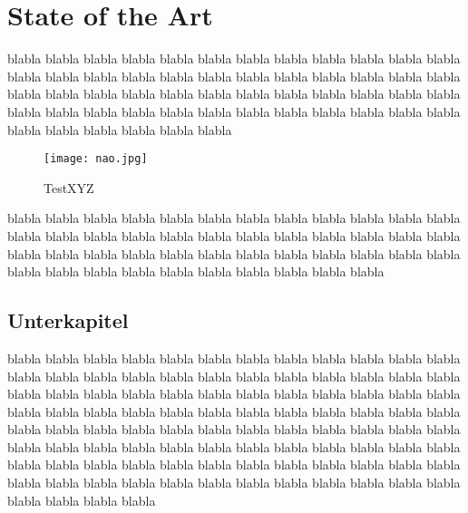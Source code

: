 \documentclass[12pt,a4paper,DIV13,pdftex,BCOR10mm,fleqn,liststotoc,bibtotoc,cleardoubleempty]{scrbook}
\begin{document}
\chapter{State of the Art}
blabla blabla blabla blabla blabla blabla blabla blabla blabla blabla blabla blabla blabla blabla blabla blabla blabla blabla blabla blabla blabla blabla blabla blabla blabla blabla blabla blabla blabla blabla blabla blabla blabla blabla blabla blabla blabla blabla blabla blabla blabla blabla blabla blabla blabla blabla blabla blabla blabla blabla blabla blabla blabla blabla
\begin{figure}[htb]
\centering
\texttt{[image: nao.jpg]} %
\caption{TestXYZ}
\label{TestXYZ}
\end{figure}
blabla blabla blabla blabla blabla blabla blabla blabla blabla blabla blabla blabla blabla blabla blabla blabla blabla blabla blabla blabla blabla blabla blabla blabla blabla blabla blabla blabla blabla blabla blabla blabla blabla blabla blabla blabla blabla blabla blabla blabla blabla blabla blabla blabla blabla blabla
\section{Unterkapitel}
blabla blabla blabla blabla blabla blabla blabla blabla blabla blabla blabla blabla blabla blabla blabla blabla blabla blabla blabla blabla blabla blabla blabla blabla blabla blabla blabla blabla blabla blabla blabla blabla blabla blabla blabla blabla blabla blabla blabla blabla blabla blabla blabla blabla blabla blabla blabla blabla blabla blabla blabla blabla blabla blabla
blabla blabla blabla blabla blabla blabla blabla blabla blabla blabla blabla blabla blabla blabla blabla blabla blabla blabla blabla blabla blabla blabla blabla blabla blabla blabla blabla blabla blabla blabla blabla blabla blabla blabla blabla blabla blabla blabla blabla blabla blabla blabla blabla blabla blabla blabla
\end{document}
